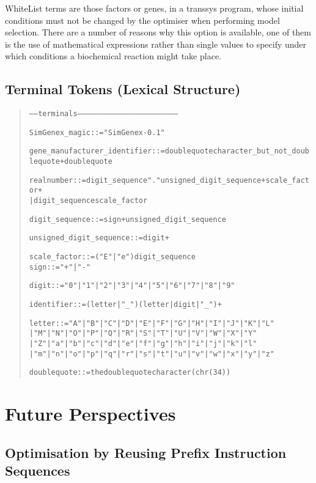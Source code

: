 \documentclass[a4paper,fleqn]{article}
\newenvironment{ebnfrule}{\begin{footnotesize}\begin{quote}\begin{alltt}}{\end{alltt}\end{quote}\end{footnotesize}}
\begin{document}
WhiteList terms are those factors or genes, in a transsys program, whose
initial conditions must not be changed by the optimiser when performing
model selection. There are a number of reasons why this option is available, 
one of them is the use of mathematical expressions rather than single values
to specify under which conditions a biochemical reaction might take place.

\subsection{Terminal Tokens (Lexical Structure)}

\begin{ebnfrule}
----- terminals --------------------------------------------------------------------

SimGenex_magic ::= "SimGenex-0.1" 


gene_manufacturer_identifier ::= doublequote character_but_not_doublequote+ doublequote

realnumber ::= digit_sequence "." unsigned_digit_sequence+ scale_factor+
                | digit_sequence scale_factor

digit_sequence ::= sign+ unsigned_digit_sequence

unsigned_digit_sequence ::= digit+


scale_factor ::= ("E" | "e") digit_sequence
sign ::=  "+" | "-"


digit ::= "0" | "1" | "2" | "3" | "4" | "5" | "6" | "7" | "8" | "9"

identifier ::= (letter | "_") (letter | digit | "_")+

letter ::= "A" | "B" | "C" | "D" | "E" | "F" | "G" | "H" | "I" | "J" | "K"| "L" 
| "M" | "N" | "O" | "P" | "Q" | "R" | "S" | "T" | "U" | "V" | "W"| "X" | "Y" 
| "Z"| "a" | "b" | "c" | "d" | "e" | "f" | "g" | "h" | "i" | "j" | "k"| "l" 
| "m" | "n" | "o" | "p" | "q" | "r" | "s" | "t" | "u" | "v" | "w" | "x" | "y" | "z"

doublequote ::= the doublequote character (chr(34))
\end{ebnfrule}




\section{Future Perspectives}

\subsection{Optimisation by Reusing Prefix Instruction Sequences}
\end{document}
